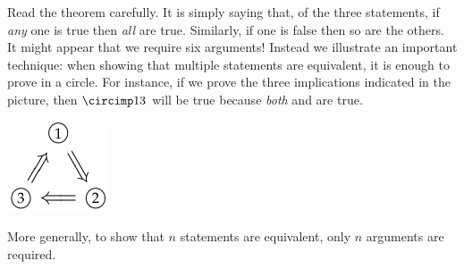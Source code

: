 \noindent\begin{minipage}{0.8\textwidth}
Read the theorem carefully. It is simply saying that, of the three statements, if \emph{any} one is true then \emph{all} are true. Similarly, if one is false then so are the others. It might appear that we require six arguments! Instead we illustrate an important technique: when showing that multiple statements are equivalent, it is enough to prove in a circle. For instance, if we prove the three implications indicated in the picture, then $\circimp 13$ will be true because \emph{both}  and  are true.\\
\end{minipage}\qquad
\begin{minipage}{0.15\textwidth}
\includegraphics[width=\textwidth]{sets-14-circlearg}
\end{minipage}

\noindent More generally, to show that $n$ statements are equivalent, only $n$ arguments are required.\pagebreak

